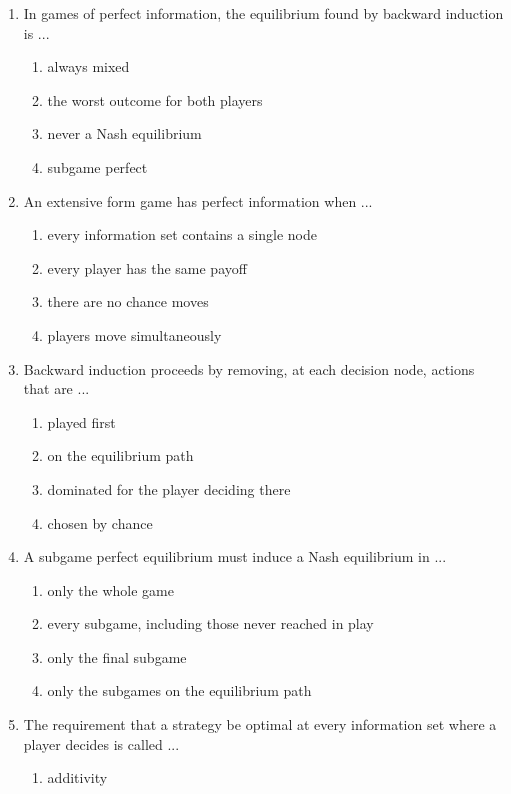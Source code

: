 \documentclass[11pt]{article}
\begin{document}
\begin{enumerate}[itemsep=6pt]
\begin{enumerate}
    \item at every information set, whether or not it is reached
  \end{enumerate}
  \item In games of perfect information, the equilibrium found by backward induction is ...
  \begin{enumerate}
    \item always mixed
    \item the worst outcome for both players
    \item never a Nash equilibrium
    \item subgame perfect
  \end{enumerate}
  \item An extensive form game has perfect information when ...
  \begin{enumerate}
    \item every information set contains a single node
    \item every player has the same payoff
    \item there are no chance moves
    \item players move simultaneously
  \end{enumerate}
  \item Backward induction proceeds by removing, at each decision node, actions that are ...
  \begin{enumerate}
    \item played first
    \item on the equilibrium path
    \item dominated for the player deciding there
    \item chosen by chance
  \end{enumerate}
  \item A subgame perfect equilibrium must induce a Nash equilibrium in ...
  \begin{enumerate}
    \item only the whole game
    \item every subgame, including those never reached in play
    \item only the final subgame
    \item only the subgames on the equilibrium path
  \end{enumerate}
  \item The requirement that a strategy be optimal at every information set where a player decides is called ...
  \begin{enumerate}
    \item additivity

\end{enumerate}
\end{enumerate}
\end{document}
